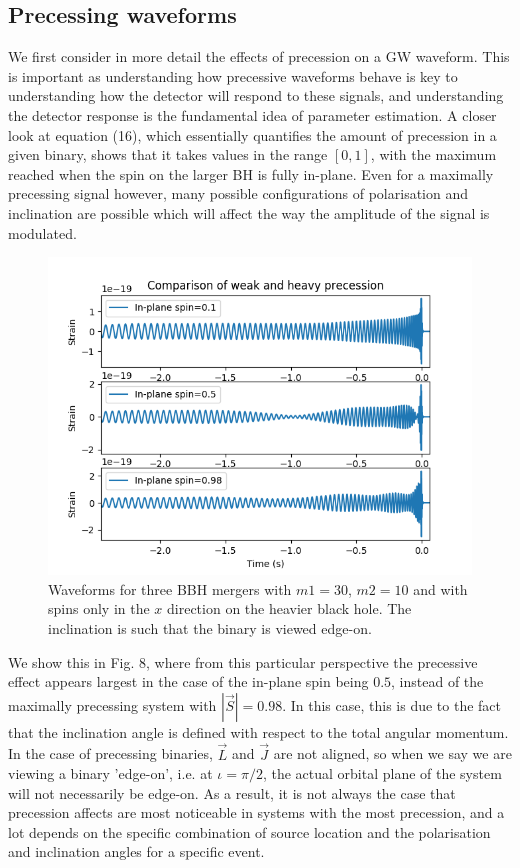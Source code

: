 \documentclass[11pt]{article}
\begin{document}
\subsection{Precessing waveforms}
We first consider in more detail the effects of precession on a GW waveform. This is important as understanding how precessive waveforms behave is key to understanding how the detector will respond to these signals, and understanding the detector response is the fundamental idea of parameter estimation. A closer look at equation (16), which essentially quantifies the amount of precession in a given binary, shows that it takes values in the range $[0,1]$, with the maximum reached when the spin on the larger BH is fully in-plane. Even for a maximally precessing signal however, many possible configurations of polarisation and inclination are possible which will affect the way the amplitude of the signal is modulated.

\begin{figure}[H]
	\includegraphics[scale=1]{fig8.png}
	\centering
	\caption{Waveforms for three BBH mergers with $m1=30$, $m2=10$ and with spins only in the $x$ direction on the heavier black hole. The inclination is such that the binary is viewed edge-on.}
	\centering
\end{figure}

We show this in Fig. 8, where from this particular perspective the precessive effect appears largest in the case of the in-plane spin being $0.5$, instead of the maximally precessing system with $|\vec{S}|=0.98$. In this case, this is due to the fact that the inclination angle is defined with respect to the total angular momentum. In the case of precessing binaries, $\vec{L}$ and $\vec{J}$ are not aligned, so when we say we are viewing a binary 'edge-on', i.e. at $\iota=\pi/2$, the actual orbital plane of the system will not necessarily be edge-on. As a result, it is not always the case that precession affects are most noticeable in systems with the most precession, and a lot depends on the specific combination of source location and the polarisation and inclination angles for a specific event.
\end{document}
